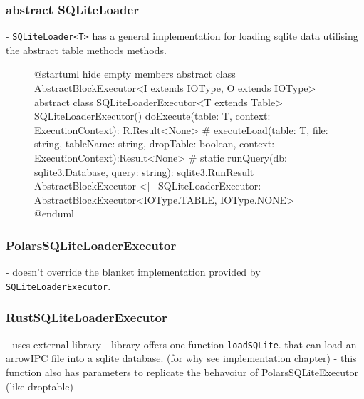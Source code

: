 \subsubsection{abstract SQLiteLoader}
- \Verb|SQLiteLoader<T>| has a general implementation for loading sqlite data utilising the abstract table methods methods.
\begin{figure}
	\begin{plantuml}
		@startuml
		hide empty members
		abstract class AbstractBlockExecutor<I extends IOType, O extends IOType>
		abstract class SQLiteLoaderExecutor<T extends Table> {
		SQLiteLoaderExecutor()
		doExecute(table: T, context: ExecutionContext): R.Result<None>
		# executeLoad(table: T, file: string, tableName: string, dropTable: boolean, context: ExecutionContext):Result<None>
		# {static} runQuery(db: sqlite3.Database, query: string): sqlite3.RunResult
		}
		AbstractBlockExecutor <|-- SQLiteLoaderExecutor: AbstractBlockExecutor<IOType.TABLE, IOType.NONE>
		@enduml
	\end{plantuml}
	\caption{}
	\label{fig:uml:sqliteloader}
\end{figure}

\subsubsection{PolarsSQLiteLoaderExecutor}
- doesn't override the blanket implementation provided by \Verb|SQLiteLoaderExecutor|.

\subsubsection{RustSQLiteLoaderExecutor}
- uses external library
- library offers one function \Verb|loadSQLite|. that can load an arrowIPC file into a sqlite database. (for why see implementation chapter)
- this function also has parameters to replicate the behavoiur of PolarsSQLiteExecutor (like droptable)

